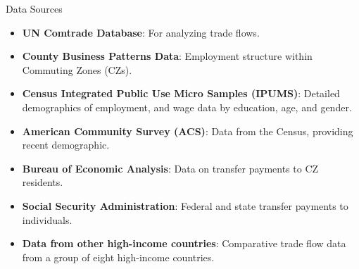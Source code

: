 \begin{frame}{Data Sources}
    \begin{itemize}
        \item \textbf{UN Comtrade Database}: For analyzing trade flows.
        \item \textbf{County Business Patterns Data}: Employment structure within Commuting Zones (CZs).
        \item \textbf{Census Integrated Public Use Micro Samples (IPUMS)}: Detailed demographics of employment, and wage data by education, age, and gender.
        \item \textbf{American Community Survey (ACS)}: Data from the Census, providing recent demographic.
        \item \textbf{Bureau of Economic Analysis}: Data on transfer payments to CZ residents.
        \item \textbf{Social Security Administration}: Federal and state transfer payments to individuals.
        \item \textbf{Data from other high-income countries}: Comparative trade flow data from a group of eight high-income countries.
    \end{itemize}
\end{frame}

